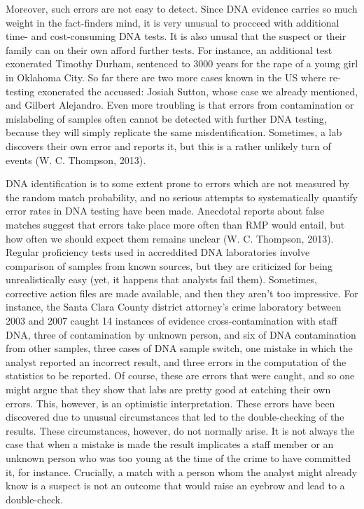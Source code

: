 \documentclass[
  10pt,
  dvipsnames,enabledeprecatedfontcommands]{scrartcl}
\begin{document}
Moreover, such errors are not easy to detect. Since DNA evidence carries
so much weight in the fact-finders mind, it is very unusual to procceed
with additional time- and cost-consuming DNA tests. It is also unusal
that the suspect or their family can on their own afford further tests.
For instance, an additional test exonerated Timothy Durham, sentenced to
3000 years for the rape of a young girl in Oklahoma City. So far there
are two more cases known in the US where re-testing exonerated the
accussed: Josiah Sutton, whose case we already mentioned, and Gilbert
Alejandro. Even more troubling is that errors from contamination or
mislabeling of samples often cannot be detected with further DNA
testing, because they will simply replicate the same misdentification.
Sometimes, a lab discovers their own error and reports it, but this is a
rather unlikely turn of events (W. C. Thompson, 2013).

DNA identification is to some extent prone to errors which are not
measured by the random match probability, and no serious attempts to
systematically quantify error rates in DNA testing have been made.
Anecdotal reports about false matches suggest that errors take place
more often than RMP would entail, but how often we should expect them
remains unclear (W. C. Thompson, 2013). Regular proficiency tests used
in accreddited DNA laboratories involve comparison of samples from known
sources, but they are criticized for being unrealistically easy (yet, it
happens that analysts fail them). Sometimes, corrective action files are
made available, and then they aren't too impressive. For instance, the
Santa Clara County district attorney's crime laboratory between 2003 and
2007 caught 14 instances of evidence cross-contamination with staff DNA,
three of contamination by unknown person, and six of DNA contamination
from other samples, three cases of DNA sample switch, one mistake in
which the analyst reported an incorrect result, and three errors in the
computation of the statistics to be reported. Of course, these are
errors that were caught, and so one might argue that they show that labs
are pretty good at catching their own errors. This, however, is an
optimistic interpretation. These errors have been discovered due to
unusual circumstances that led to the double-checking of the results.
These circumstances, however, do not normally arise. It is not always
the case that when a mistake is made the result implicates a staff
member or an unknown person who was too young at the time of the crime
to have committed it, for instance. Crucially, a match with a person
whom the analyst might already know is a suspect is not an outcome that
would raise an eyebrow and lead to a double-check.
\end{document}

